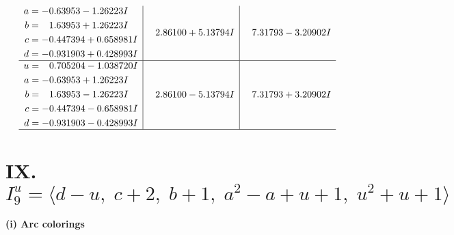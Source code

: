 \documentclass[1p]{elsarticle_modified}
\theoremstyle{definition}
\begin{document}
$$\begin{array}{c|c|c}
\begin{aligned}
a &= -0.63953 - 1.26223 I \\
b &= \phantom{-}1.63953 + 1.26223 I \\
c &= -0.447394 + 0.658981 I \\
d &= -0.931903 + 0.428993 I\end{aligned}
 & \phantom{-}2.86100 + 5.13794 I & \phantom{-}7.31793 - 3.20902 I \\ \hline\begin{aligned}
u &= \phantom{-}0.705204 - 1.038720 I \\
a &= -0.63953 + 1.26223 I \\
b &= \phantom{-}1.63953 - 1.26223 I \\
c &= -0.447394 - 0.658981 I \\
d &= -0.931903 - 0.428993 I\end{aligned}
 & \phantom{-}2.86100 - 5.13794 I & \phantom{-}7.31793 + 3.20902 I\\
 \hline 
 \end{array}$$\newpage\newpage\renewcommand{\arraystretch}{1}
\centering \section*{IX. $I^u_{9}= \langle d- u,\;c+2,\;b+1,\;a^2- a+u+1,\;u^2+u+1 \rangle$}
\flushleft \textbf{(i) Arc colorings}\\
\end{document}
